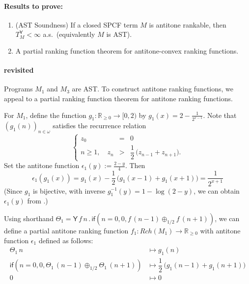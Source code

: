 \documentclass{article}
\newcommand{\Real}{\mathbb{R}}
\newcommand{\nnReal}{\mathbb{R}_{{\geq}0}}
\newcommand{\tY}{\mathsf{Y}}
\newcommand{\tif}[3]{\mathsf{if}(#1, #2, #3)} %
\theoremstyle{definition}
\theoremstyle{lemma}
\theoremstyle{remark}
\begin{document}
\paragraph{Results to prove:}
\begin{enumerate}
\item (AST Soundness) If a closed SPCF term $M$ is antitone rankable, then $T^{\tY}_M < \infty$ a.s.~(equivalently $M$ is AST). 

\item A partial ranking function theorem for antitone-convex ranking functions. 
\end{enumerate}

\paragraph{ revisited}

Programs $M_1$ and $M_3$ are AST.
To construct antitone ranking functions, we appeal  to a partial ranking function theorem for antitone ranking functions.
\iffalse
\lo{NOTE. Suppose a function $f : E \to \Real$ from a convex subset $E \subseteq \Real^n$ has continuous second-order partial derivatives. Then it is convex iff its Hessian is positive semidefinite.}
\fi
\iffalse
For $M_1$, consider the function $g_1(n) := \frac{2^n - 1}{2^{n-1}}$.
\fi

For $M_1$, define the function $g_1 : \nnReal \to [0, 2)$ by $g_1(x) = 2 - \frac{1}{2^{x-1}}$.
Note that $(g_1 (n))_{n \in \omega}$ satisfies the recurrence relation
\[
\left\{
\begin{array}{rll}
z_0 &=& 0\\
n \geq 1, \quad z_n &>& \dfrac{1}{2} \, \big( z_{n-1} + z_{n+1}\big).
\end{array}
\right.
\]
Set the antitone function $\epsilon_1 (y) :=  \frac{2-y}{4}$.
Then
\begin{equation}
\epsilon_1(g_1(x)) = g_1(x) - \dfrac{1}{2} \, \big(g_1(x-1) + g_1(x+1)\big) = \dfrac{1}{2^{x+1}}
\label{eqn:epsilon g M1}
\end{equation}
(Since $g_1$ is bijective, with inverse $g_1^{-1}(y) = 1 - \log (2-y)$, we can obtain $\epsilon_1(y)$ from .) 

Using shorthand 
$\Theta_1 = \tY \, f \, n \, . \, 
\tif{n = 0}{0}{f \, (n - 1) \oplus_{1/2} f \, (n + 1)}$, 
we can define a partial antitone ranking function $f_1 : \mathit{Rch}(M_1) \to \nnReal$ with antitone function $\epsilon_1$ defined as follows:
\begin{align*}
{\Theta_1} \, n 
&\mapsto 
g_1(n)
\\
\tif{n = 0}{0}{\Theta_1 \, (n - 1) \oplus_{1/2} \Theta_1 \, (n + 1)}
&\mapsto
\dfrac{1}{2} \, \big(g_1(n-1) + g_1(n+1)\big)
\\
0 &\mapsto 0
\end{align*}
\end{document}
